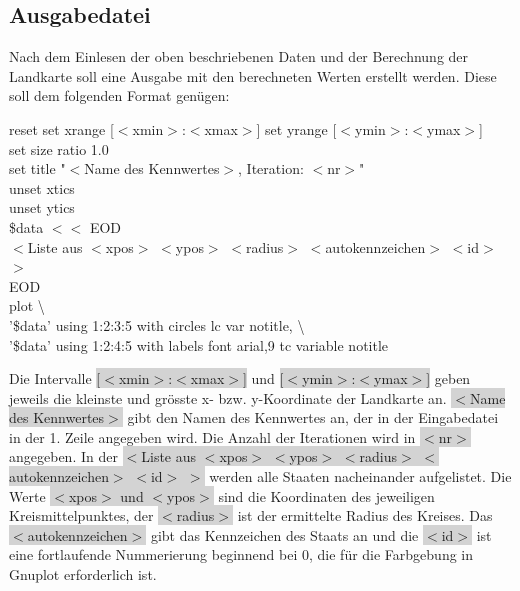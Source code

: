 \documentclass[a4paper,11pt]{article}
\begin{document}
{\subsection{Ausgabedatei}
Nach dem Einlesen der oben beschriebenen Daten und der Berechnung der Landkarte soll eine Ausgabe mit den berechneten Werten erstellt werden.
Diese soll dem folgenden Format gen\"ugen:
\begin{mdframed}[linewidth=0pt, backgroundcolor=background, innertopmargin=10pt, innerbottommargin=10pt]
	reset
	set xrange [$<$xmin$>$:$<$xmax$>$]
	set yrange [$<$ymin$>$:$<$ymax$>$]\\
	set size ratio 1.0\\
	set title "$<$Name des Kennwertes$>$, Iteration: $<$nr$>$"\\
	unset xtics\\
	unset ytics\\
	\$data $<<$ EOD\\
	$<$Liste aus $<$xpos$>$ $<$ypos$>$ $<$radius$>$ $<$autokennzeichen$>$ $<$id$>$ $>$\\
	EOD\\
	plot \textbackslash\\
	'\$data' using 1:2:3:5 with circles lc var notitle, \textbackslash\\
	'\$data' using 1:2:4:5 with labels font \grqq{}arial,9\grqq{}  tc variable notitle\\
\end{mdframed}
\vspace{5mm}
Die Intervalle \colorbox{lightgray}{[$<$xmin$>$:$<$xmax$>$]} und \colorbox{lightgray}{[$<$ymin$>$:$<$ymax$>$]} geben jeweils die kleinste und gr\"osste x- bzw. y-Koordinate der Landkarte an.
\colorbox{lightgray}{$<$Name des Kennwertes$>$} gibt den Namen des Kennwertes an, der in der Eingabedatei in der 1. Zeile angegeben wird.
Die Anzahl der Iterationen wird in \colorbox{lightgray}{$<$nr$>$} angegeben.
In der \colorbox{lightgray}{$<$Liste aus $<$xpos$>$ $<$ypos$>$ $<$radius$>$ $<$autokennzeichen$>$ $<$id$>$ $>$} werden alle Staaten nacheinander aufgelistet. Die Werte
\colorbox{lightgray}{$<$xpos$>$ und $<$ypos$>$} sind die Koordinaten des jeweiligen Kreismittelpunktes, der \colorbox{lightgray}{$<$radius$>$} ist der ermittelte Radius des Kreises.
Das \colorbox{lightgray}{$<$autokennzeichen$>$} gibt das Kennzeichen des Staats an und die \colorbox{lightgray}{$<$id$>$} ist eine fortlaufende Nummerierung beginnend bei 0, die f\"ur die 
Farbgebung in Gnuplot erforderlich ist.\\
\vspace{40mm}\\
}
\end{document}
